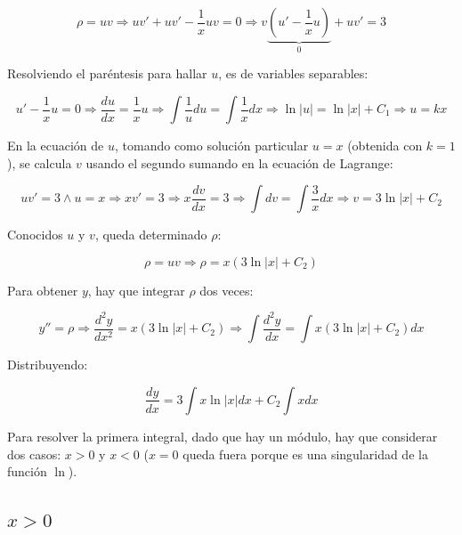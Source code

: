 \documentclass{article}
\begin{document}
\begin{equation}
\rho = u v \Rightarrow uv' + uv' - \frac{1}{x} uv = 0 \Rightarrow v \underbrace{ \left(u' - \frac{1}{x} u \right) }_{0} + uv' = 3
\end{equation}

Resolviendo el paréntesis para hallar $u$, es de variables separables:

\begin{equation}
u' - \frac{1}{x} u = 0 \Rightarrow \frac{du}{dx} = \frac{1}{x} u \Rightarrow \int \frac{1}{u} du = \int \frac{1}{x} dx \Rightarrow \ln |u| = \ln |x| + C_1 \Rightarrow u = k x
\end{equation}

En la ecuación de $u$, tomando como solución particular $u = x$ (obtenida con $k=1$), se calcula $v$ usando el segundo sumando en la ecuación de Lagrange:

\begin{equation}
u v' = 3 \wedge u = x \Rightarrow x v' = 3 \Rightarrow x \frac{dv}{dx} = 3 \Rightarrow \int dv = \int \frac{3}{x} dx \Rightarrow v = 3 \ln |x| + C_2
\end{equation}

Conocidos $u$ y $v$, queda determinado $\rho$:

\begin{equation}
\rho = u v \Rightarrow \rho = x (3 \ln |x| + C_2)
\end{equation}

Para obtener $y$, hay que integrar $\rho$ dos veces:

\begin{equation}
y'' = \rho \Rightarrow \frac{d^2y}{dx^2} = x (3 \ln |x| + C_2) \Rightarrow \int \frac{d^2y}{dx} = \int x (3 \ln |x| + C_2) dx
\end{equation}

Distribuyendo:

\begin{equation}
\frac{dy}{dx} = 3 \int x \ln |x| dx + C_2 \int x dx
\end{equation}

Para resolver la primera integral, dado que hay un módulo, hay que considerar dos casos: $x>0$ y $x <0$ ($x=0$ queda fuera porque es una singularidad de la función $\ln$).

\subsection{\texorpdfstring{$x > 0$}{x > 0}}
\end{document}
